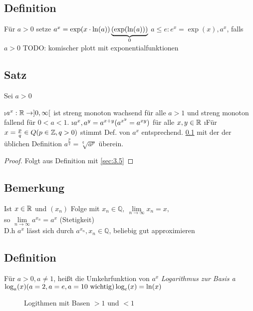 \subsection{Definition}\label{sec:5.18}
Für $a > 0$ setze $a^x = \exp(x \cdot \ln(a)) \underbrace{(\mathit{\exp(\ln(a))})}_0$
$a \leq e : e^x = \exp(x), a^x$, falls $a > 0$
TODO: komischer plott mit exponentialfunktionen\\
\subsection[Satz:]{Satz}\label{sec:5.19}
Sei $a > 0$
\begin{enumerate}[a)]
\i $a^x: \mathbb{R} \to ]0,\infty[$ ist streng monoton wachsend für alle $a > 1$ und streng monoton fallend für $0 < a < 1$.
\i $a^x, a^y = a^{x+y}\\
(a^{x^{y}} = a^{xy})$ für alle $x,y \in \mathbb{R}$
\i Für $x = \frac{p}{q} \in Q (p \in \mathbb{Z}, q > 0)$ stimmt Def. von $a^x$ entsprechend. \ref{sec:5.18} mit der der üblichen Definition $a^{\frac{p}{q}} = \sqrt[q]{a^p}$ überein.
\begin{proof}
Folgt aus Definition mit \ref{sec:3.5}
\end{proof}
\end{enumerate}
\subsection{Bemerkung}
Ist $x \in \mathbb{R}$ und $(x_n)$ Folge mit $x_n \in \mathbb{Q},\ \lim\limits_{n \to \infty} x_n = x,$\\
so $\lim\limits_{n \to \infty} a^{x_n} = a^x$ \hfill(Stetigkeit)\\
D.h $a^x$ lässt sich durch $a^{x_n}, x_n \in \mathbb{Q}$, beliebig gut approximieren
\subsection{Definition}
Für $a > 0, a \neq 1$, hei\ss t die Umkehrfunktion von $a^x$ \emph{Logarithmus zur Basis a} \\
$\log_a (x) \hfill (a =2,a=e,a=10 \text{ wichtig})\\
\log_e (x) = \ln (x)\\
$
\begin{figure}[h!]
\centering
{}
\caption{Logithmen mit Basen $>1$ und $<1$}
\end{figure}
